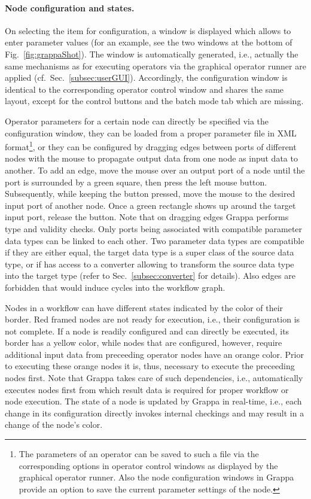 \paragraph{Node configuration and states.} On selecting the item for
configuration, a window is displayed which allows to enter parameter values
(for an example, see the two windows at the bottom of Fig.~\ref{fig:grappaShot}).
The window is automatically generated, i.e., actually the same 
mechanisms as for executing operators via the graphical operator runner are applied (cf.~Sec.~\ref{subsec:userGUI}). Accordingly, 
the configuration window is identical to the corresponding operator control
window and shares the same layout, except for the control buttons and the batch
mode tab which are missing.

Operator parameters for a certain node can directly be specified via the
configuration window, they can be loaded from a proper parameter file in XML
format\footnote{The parameters of an operator can be saved to such a file via
the corresponding options in operator control windows as displayed by the
graphical operator runner. Also the node configuration windows in Grappa
provide an option to save the current parameter settings of the node.}, or they
can be configured by dragging edges between ports of different nodes with the
mouse to propagate output data from one node as input data to another. To add an
edge, move the mouse over an output port of a node until the port is surrounded
by a green square, then press the left mouse button. Subsequently, while keeping
the button pressed, move the mouse to the desired input port of another node.
Once a green rectangle shows up around the target input port, release the
button. Note that on dragging edges Grappa performs type and validity checks.
Only ports being associated with compatible parameter data types can be
linked to each other. Two parameter data types are compatible if they are
either equal, the target data type is a super class of the source data type, or
if \alida has access to a converter allowing to transform the source data type
into the target type (refer to Sec.~\ref{subsec:converter} for details). Also
edges are forbidden that would induce cycles into the workflow graph.

Nodes in a workflow can have different states indicated by the color of their border. 
Red framed nodes are not ready for execution, i.e., their configuration is not
complete. If a node is readily configured and can directly be executed, its
border has a yellow color, while nodes that are configured, however, require
additional input data from preceeding operator nodes have an orange color.
Prior to executing these orange nodes it is, thus, necessary to execute the
preceeding nodes first.
Note that Grappa takes care of such dependencies, i.e., automatically executes
nodes first from which result data is required for proper workflow or node
execution. The state of a node is updated by Grappa in real-time, i.e., each
change in its configuration directly invokes internal checkings and may result in a change of the node's color.

